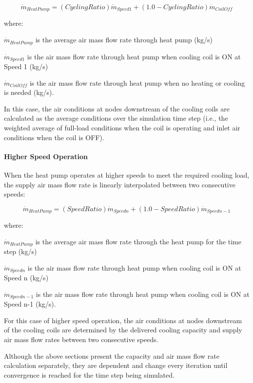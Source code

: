 \begin{equation}
{\dot m_{HeatPump}} = (CyclingRatio){\dot m_{Speed1}} + (1.0 - CyclingRatio){\dot m_{CoilOff}}
\end{equation}

where:

\({\dot m_{HeatPump}}\) is the average air mass flow rate through heat pump (kg/s)

\({{{\dot m}_{Speed1}}}\) is the air mass flow rate through heat pump when cooling coil is ON at Speed 1 (kg/s)

\({{{\dot m}_{CoilOff}}}\) is the air mass flow rate through heat pump when no heating or cooling is needed (kg/s).

In this case, the air conditions at nodes downstream of the cooling coils are calculated as the average conditions over the simulation time step (i.e., the weighted average of full-load conditions when the coil is operating and inlet air conditions when the coil is OFF).

\paragraph{Higher Speed Operation}\label{higher-speed-operation-1}

When the heat pump operates at higher speeds to meet the required cooling load, the supply air mass flow rate is linearly interpolated between two consecutive speeds:

\begin{equation}
{\dot m_{HeatPump}} = (SpeedRatio){\dot m_{Speedn}} + (1.0 - SpeedRatio){\dot m_{Speedn-1}}
\end{equation}

where:

\({\dot m_{HeatPump}}\) is the average air mass flow rate through the heat pump for the time step (kg/s)

\({\dot m_{Speedn}}\) is the air mass flow rate through heat pump when cooling coil is ON at Speed n (kg/s)

\({\dot m_{Speedn-1}}\) is the air mass flow rate through heat pump when cooling coil is ON at Speed n-1 (kg/s).

For this case of higher speed operation, the air conditions at nodes downstream of the cooling coils are determined by the delivered cooling capacity and supply air mass flow rates between two consecutive speeds.

Although the above sections present the capacity and air mass flow rate calculation separately, they are dependent and change every iteration until convergence is reached for the time step being simulated.

